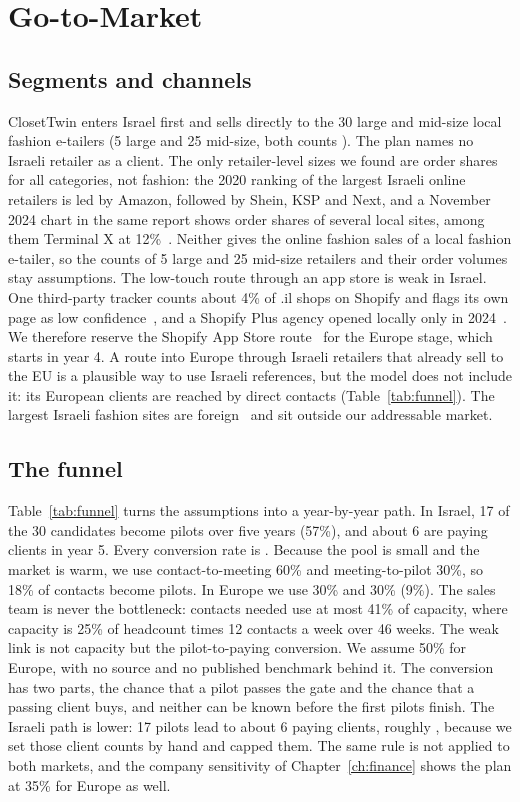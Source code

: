 \chapter{Go-to-Market}\label{ch:gtm}

\section{Segments and channels}\label{sec:segments}
ClosetTwin enters Israel first and sells directly to the 30 large and mid-size local fashion e-tailers (5 large and 25 mid-size, both counts ). The plan names no Israeli retailer as a client. The only retailer-level sizes we found are order shares for all categories, not fashion: the 2020 ranking of the largest Israeli online retailers is led by Amazon, followed by Shein, KSP and Next, and a November 2024 chart in the same report shows order shares of several local sites, among them Terminal X at 12\%~\cite{knesset_ric2025}. Neither gives the online fashion sales of a local fashion e-tailer, so the counts of 5 large and 25 mid-size retailers and their order volumes stay assumptions. The low-touch route through an app store is weak in Israel. One third-party tracker counts about 4\% of .il shops on Shopify and flags its own page as low confidence~\cite{aguko_shopify_il}, and a Shopify Plus agency opened locally only in 2024~\cite{globes2024shopify}. We therefore reserve the Shopify App Store route~\cite{shopify_dev_build} for the Europe stage, which starts in year 4. A route into Europe through Israeli retailers that already sell to the EU is a plausible way to use Israeli references, but the model does not include it: its European clients are reached by direct contacts (Table~\ref{tab:funnel}). The largest Israeli fashion sites are foreign~\cite{knesset_ric2025} and sit outside our addressable market.

\section{The funnel}\label{sec:funnel}
Table~\ref{tab:funnel} turns the assumptions into a year-by-year path. In Israel, 17 of the 30 candidates become pilots over five years (57\%), and about 6 are paying clients in year 5. Every conversion rate is . Because the pool is small and the market is warm, we use contact-to-meeting 60\% and meeting-to-pilot 30\%, so 18\% of contacts become pilots. In Europe we use 30\% and 30\% (9\%). The sales team is never the bottleneck: contacts needed use at most 41\% of capacity, where capacity is 25\% of headcount times 12 contacts a week over 46 weeks. The weak link is not capacity but the pilot-to-paying conversion. We assume 50\% for Europe, with no source and no published benchmark behind it. The conversion has two parts, the chance that a pilot passes the gate and the chance that a passing client buys, and neither can be known before the first pilots finish. The Israeli path is lower: 17 pilots lead to about 6 paying clients, roughly , because we set those client counts by hand and capped them. The same rule is not applied to both markets, and the company sensitivity of Chapter~\ref{ch:finance} shows the plan at 35\% for Europe as well.

